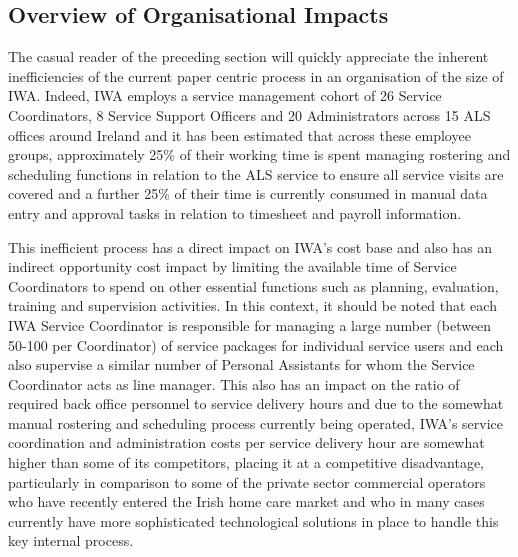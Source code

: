 \documentclass[a4paper,Times New Roman 11pt]{article}
\begin{document}
\begin{samepage}
\subsection {Overview of Organisational  Impacts}
The casual reader of the preceding section will quickly appreciate the inherent inefficiencies of the current paper centric process in an organisation of the size of IWA. Indeed, IWA employs a service management cohort of 26 Service Coordinators, 8 Service Support Officers and 20 Administrators across 15 ALS offices around Ireland and it has been estimated that across these employee groups, approximately 25\% of their working time is spent managing rostering and scheduling functions in relation to the ALS service to ensure all service visits are covered and a further 25\% of their time is currently consumed in manual data entry and approval tasks in relation to timesheet and payroll information. 

This inefficient process has a direct impact on IWA's cost base and also has an indirect opportunity cost impact by limiting the available time of Service Coordinators to spend on other essential functions such as planning, evaluation, training and supervision activities. In this context, it should be noted that each IWA Service Coordinator is responsible for managing a large number (between 50-100 per Coordinator) of service packages for individual service users and each also supervise a similar number of Personal Assistants for whom the Service Coordinator acts as line manager. This also has an impact on the ratio of required back office personnel to service delivery hours and due to the somewhat manual rostering and scheduling process currently being operated,  IWA's service coordination and administration costs per service delivery hour are somewhat higher than some of its competitors, placing it at a competitive disadvantage, particularly in comparison to some of the private sector commercial operators who have recently entered the Irish home care market and who in many cases currently have more sophisticated technological solutions in place to handle this key internal process. 


\end{samepage}
\end{document}
